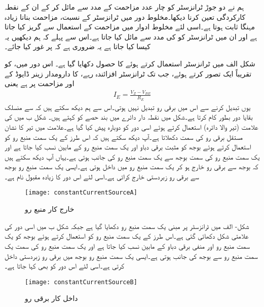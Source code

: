 ہم نے دو جوڑ ٹرانزسٹر کو چار عدد مزاحمت کے مدد سے مائل کر کے ان کے نقطہ کارکردگی تعین کرنا دیکھا۔مخلوط دور میں ٹرانزسٹر کے نسبت، مزاحمت بنانا زیادہ مہنگا ثابت ہوتا ہے۔اسی لئے مخلوط ادوار میں مزاحمت کے استعمال سے گریز کیا جاتا ہے اور ان میں ٹرانزسٹر کو   کی مدد سے مائل کیا جاتا ہے۔اس سے پہلے کہ ہم دیکھیں یہ کیسا کیا جاتا ہے یہ ضروری ہے کہ  پر غور کیا جائے۔

شکل   الف میں   ٹرانزسٹر استعمال کرتے ہوئے  کا حصول دکھایا گیا ہے۔ اس دور میں،  کو تقریباً ایک   تصور کرتے ہوئے، جب تک ٹرانزسٹر افزائندہ  رہے،   کا دارومدار زینر ڈایوڈ کے  اور مزاحمت  پر ہے یعنی
\begin{align*}
I_E=\frac{V_Z-V_{BE}}{R_E}
\end{align*}
یوں   تبدیل کرنے سے اس میں برقی رو تبدیل نہیں ہوتی۔اس سے ہم دیکھ سکتے ہیں کہ    سے منسلک بقایا دور بطور  کام کرتا ہے۔شکل میں نقطہ دار دائرے میں بند حصے کو  کہتے ہیں۔
شکل  ب میں  کی علامت (تیر والا دائرہ) استعمال کرتے ہوئے اسی دور کو دوبارہ پیش کیا گیا ہے۔علامت میں تیر کا نشان مستقل برقی رو کی سمت دکھلاتا ہے۔آپ دیکھ سکتے ہیں کہ اس طرز کے یک سمت  منبع رو کو استعمال کرتے ہوئے بوجھ کو مثبت برقی دباو  اور یک سمت  منبع رو کے مابین نسب کیا جاتا ہے اور یک سمت  منبع رو  کی سمت بوجھ سے یک سمت  منبع رو کی جانب ہوتی ہے۔یہاں آپ دیکھ سکتے ہیں کہ بوجھ سے برقی رو خارج ہو کر یک سمت  منبع رو میں داخل ہوتی ہے۔ایسی یک سمت  منبع رو بوجھ سے برقی رو زبردستی خارج  کراتی ہے۔اسی لئے اس دور کا زیادہ مقبول نام  ہے۔ 
\begin{figure}
\centering
\texttt{[image: constantCurrentSourceA]}
\caption{خارج کار منبع رو}
\label{شکل_پیداکار_مستقل_برقی_رو}
\end{figure}
شکل- الف میں  ٹرانزسٹر پر مبنی یک سمت  منبع رو دکھایا گیا ہے جبکہ شکل  ب میں اسی دور کی علامتی شکل دکھائی گئی ہے۔اس طرز کے یک سمت  منبع رو کو استعمال کرتے ہوئے بوجھ کو یک سمت  منبع رو اور منفی برقی دباو   کے مابین نسب کیا جاتا ہے اور یک سمت  منبع رو  کی سمت یک سمت  منبع رو سے بوجھ کی جانب ہوتی ہے۔ایسی یک سمت  منبع رو بوجھ میں برقی رو زبردستی داخل  کرتی ہے۔اسی لئے اس دور کو  بھی کہا جاتا ہے۔ 
\begin{figure}
\centering
\texttt{[image: constantCurrentSourceB]}
\caption{داخل کار برقی رو}
\label{شکل_پیداکار_مستقل_برقی_رو_ب}
\end{figure}

